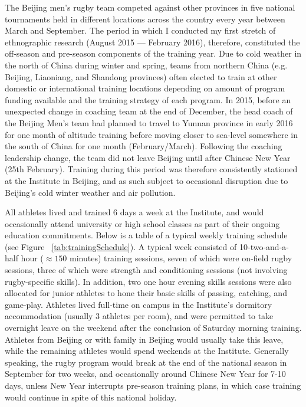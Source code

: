 \begin{CJK}{UTF8}{gbsn}
 The Beijing men's rugby team competed against other provinces in five national tournaments held in different locations across the country every year between March and September.  The period in which I conducted my first stretch of ethnographic research (August 2015 --- February 2016), therefore, constituted the off-season and pre-season components of the training year.  Due to cold weather in the north of China during winter and spring, teams from northern China (e.g. Beijing, Liaoniang, and Shandong provinces) often elected to train at other domestic or international training locations depending on amount of program funding available and the training strategy of each program.  In 2015, before an unexpected change in coaching team at the end of December, the head coach of the Beijing Men's team had planned to travel to Yunnan province in early 2016 for one month of altitude training before moving closer to sea-level somewhere in the south of China for one month (February/March).  Following the coaching leadership change, the team did not leave Beijing until after Chinese New Year (25th February). Training during this period was therefore consistently stationed at the Institute in Beijing, and as such subject to occasional disruption due to Beijing's cold winter weather and air pollution.

 All athletes lived and trained 6 days a week at the Institute, and would occasionally attend university or high school classes as part of their ongoing education commitments.  Below is a table of a typical weekly training schedule (see Figure ~\ref{tab:trainingSchedule}). A typical week consisted of 10-two-and-a-half hour ($\approx 150$ minutes) training sessions, seven of which were on-field rugby sessions, three of which were strength and conditioning sessions (not involving rugby-specific skills).  In addition, two one hour evening skills sessions were also allocated for junior athletes to hone their basic skills of passing, catching, and game-play.  Athletes lived full-time on campus in the Institute's dormitory accommodation (usually 3 athletes per room), and were permitted to take overnight leave on the weekend after the conclusion of Saturday morning training.  Athletes from Beijing or with family in Beijing would usually take this leave, while the remaining athletes would spend weekends at the Institute.  Generally speaking, the rugby program would break at the end of the national season in September for two weeks, and occasionally around Chinese New Year for 7-10 days, unless New Year interrupts pre-season training plans, in which case training would continue in spite of this national holiday.


\end{CJK}
